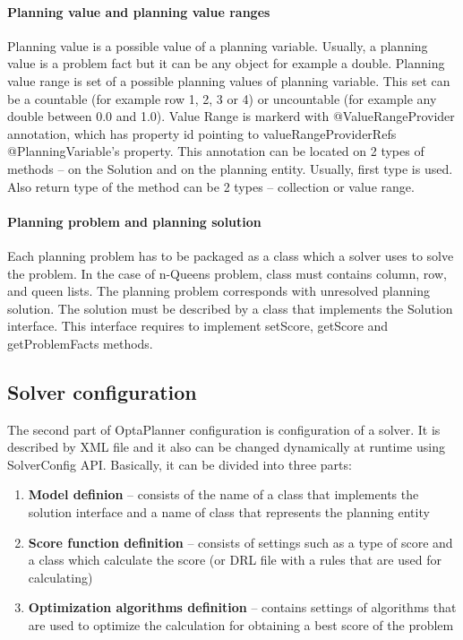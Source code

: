 \paragraph{Planning value and planning value ranges}
Planning value is a possible value of a planning variable. Usually, a planning value is a problem fact but it can be any object for example a double. Planning value range is set of a possible planning values of planning variable. This set can be a countable (for example row 1, 2, 3 or 4) or uncountable (for example any double between 0.0 and 1.0). Value Range is markerd with @ValueRangeProvider annotation, which has property id pointing to valueRangeProviderRefs @PlanningVariable's property. This annotation can be located on 2 types of methods -- on the Solution and on the planning entity. Usually, first type is used. Also return type of the method can be 2 types -- collection or value range.

\paragraph{Planning problem and planning solution}
Each planning problem has to be packaged as a class which a solver uses to solve the problem. In the case of n-Queens problem, class must contains column, row, and queen lists. The planning problem corresponds with unresolved planning solution. The solution must be described by a class that implements the Solution interface. This interface requires to implement setScore, getScore and getProblemFacts methods.

\subsection{Solver configuration}
The second part of OptaPlanner configuration is configuration of a solver. It is described by XML file and it also can be changed dynamically at runtime using SolverConfig API. Basically, it can be divided into three parts:

\begin{enumerate}
\item \textbf{Model definion} -- consists of the name of a class that implements the solution interface and a name of class that represents the planning entity
\item \textbf{Score function definition} -- consists of settings such as a type of score and a class which calculate the score (or DRL file with a rules that are used for calculating)
\item \textbf{Optimization algorithms definition} -- contains settings of algorithms that are used to optimize the calculation for obtaining a best score of the problem
\end{enumerate}

